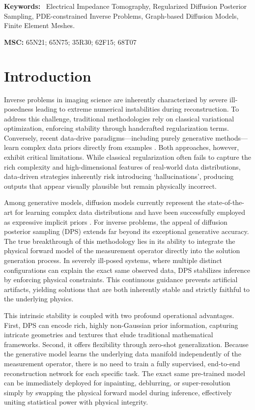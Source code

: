 \documentclass[a4paper,11pt]{article}
\theoremstyle{definition}
\theoremstyle{plain}
\theoremstyle{remark}
\newenvironment{keywords}
{\par\medskip\noindent\textbf{Keywords:}\ }
{\par\medskip}
\newcommand{\MSC}[1]{%
\par\medskip\noindent\textbf{MSC: }#1\par\medskip
}
\begin{document}
\begin{keywords}
Electrical Impedance Tomography,
Regularized Diffusion Posterior Sampling,
PDE-constrained Inverse Problems,
Graph-based Diffusion Models,
Finite Element Meshes.
\end{keywords}

\MSC{65N21; 65N75; 35R30; 62F15; 68T07}

\section{Introduction}
Inverse problems in imaging science are inherently characterized by severe ill-posedness leading to extreme numerical instabilities during reconstruction. To address this challenge, traditional methodologies rely on classical variational optimization, enforcing stability through handcrafted regularization terms. Conversely, recent data-drive paradigms—including purely generative methods---learn complex data priors directly from examples \cite{arridge2019solving,bubba-book}. Both approaches, however, exhibit critical limitations. While classical regularization often fails to capture the rich complexity and high-dimensional features of real-world data distributions, data-driven strategies inherently risk introducing `hallucinations', producing outputs that appear visually plausible but remain physically incorrect.


Among generative models, diffusion models currently represent the state-of-the-art for learning complex data distributions and have been successfully employed as expressive implicit priors \cite{ho2020denoising, song2020score}.  
For inverse problems, the appeal of diffusion posterior sampling (DPS) \cite{DPS24}  extends far beyond its exceptional generative accuracy. The true breakthrough of this methodology lies in its ability to integrate the physical forward model of the measurement operator directly into the solution generation process. In severely ill-posed systems, where multiple distinct configurations can explain the exact same observed data, DPS stabilizes inference by enforcing physical constraints.
This continuous guidance prevents artificial artifacts, yielding solutions that are both inherently stable and strictly faithful to the underlying physics.

This intrinsic stability is coupled with two profound operational advantages. First, DPS can encode rich, highly non-Gaussian prior information, capturing intricate geometries and textures that elude traditional mathematical frameworks. Second, it offers flexibility through zero-shot generalization. Because the generative model learns the underlying data manifold independently of the measurement operator, there is no need to train a fully supervised, end-to-end reconstruction network for each specific task. The exact same pre-trained model can be immediately deployed for inpainting, deblurring, or super-resolution simply by swapping the physical forward model during inference, effectively uniting statistical power with physical integrity.
\end{document}
